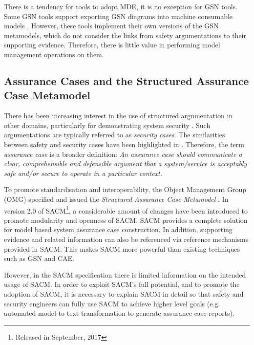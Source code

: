 There is a tendency for tools to adopt MDE, it is no exception for GSN tools. 
Some GSN tools support exporting GSN diagrams into machine consumable models \cite{certWare, astahGSN}.
However, these tools implement their own versions of the GSN metamodels, which do not consider the links from safety argumentations to their supporting evidence. 
Therefore, there is little value in performing model management operations on them.


%

\subsection{Assurance Cases and the Structured Assurance Case Metamodel}
There has been increasing interest in the use of structured argumentation in other domains, particularly for demonstrating system security \cite{bloomfield2010safety}. 
Such argumentations are typically referred to as \textit{security cases}. 
The similarities between safety and security cases have been highlighted in \cite{lautieri2005safsec}. 
Therefore, the term \textit{assurance case} is a broader definition: \textit{An assurance case should communicate a clear, comprehensible and defensible argument that a system/service is acceptably safe and/or secure to operate in a particular context.} 

To promote standardisation and interoperability, the Object Management Group (OMG) specified and issued the \textit{Structured Assurance Case Metamodel} \cite{sacm}. 
In version 2.0 of SACM\footnote{Released in September, 2017}, a considerable amount of changes have been introduced to promote modularity and openness of SACM. 
SACM provides a complete solution for model based system assurance case construction. 
In addition, supporting evidence and related information can also be referenced via reference mechanisms provided in SACM. 
This makes SACM more powerful than existing techniques such as GSN and CAE.

However, in the SACM specification there is limited information on the intended usage of SACM. 
In order to exploit SACM's full potential, and to promote the adoption of SACM, it is necessary to explain SACM in detail so that safety and security engineers can fully use SACM to achieve higher level goals (e.g. automated model-to-text transformation to generate assurance case reports). 

